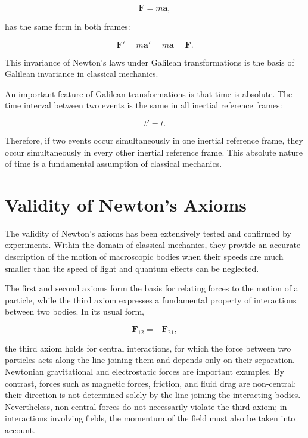 \documentclass[../main.tex]{subfiles}
\begin{document}
\begin{equation}
\mathbf{F} = m\mathbf{a},
\end{equation}

has the same form in both frames:

\begin{equation}
\mathbf{F}' = m\mathbf{a}' = m\mathbf{a} = \mathbf{F}.
\end{equation}

This invariance of Newton's laws under Galilean transformations is the basis of Galilean invariance in classical mechanics.

An important feature of Galilean transformations is that time is absolute. The time interval between two events is the same in all inertial reference frames:

\begin{equation}
t' = t.
\end{equation}

Therefore, if two events occur simultaneously in one inertial reference frame, they occur simultaneously in every other inertial reference frame. This absolute nature of time is a fundamental assumption of classical mechanics.

\section{Validity of Newton's Axioms}

The validity of Newton's axioms has been extensively tested and confirmed by experiments. Within the domain of classical mechanics, they provide an accurate description of the motion of macroscopic bodies when their speeds are much smaller than the speed of light and quantum effects can be neglected.

The first and second axioms form the basis for relating forces to the motion of a particle, while the third axiom expresses a fundamental property of interactions between two bodies. In its usual form,

$$
\mathbf{F}_{12}=-\mathbf{F}_{21},
$$

the third axiom holds for central interactions, for which the force between two particles acts along the line joining them and depends only on their separation. Newtonian gravitational and electrostatic forces are important examples. By contrast, forces such as magnetic forces, friction, and fluid drag are non-central: their direction is not determined solely by the line joining the interacting bodies. Nevertheless, non-central forces do not necessarily violate the third axiom; in interactions involving fields, the momentum of the field must also be taken into account.
\end{document}
